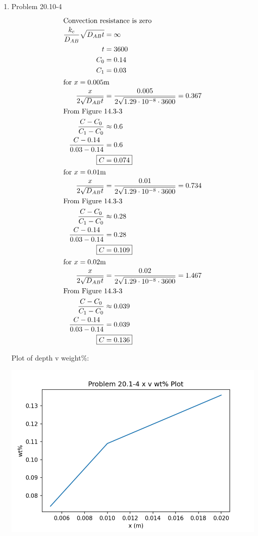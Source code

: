 \documentclass[12pt]{article}
\begin{document}
\begin{enumerate}
\newpage
    \item Problem 20.10-4
    \begin{align*}
        \intertext{Convection resistance is zero}
        \frac{k_c}{D_{AB}} \sqrt{D_{AB} t} &= \infty \\
        t &= 3600 \\
        C_0 &= 0.14 \\
        C_1 &= 0.03 \\
        \intertext{for $x=0.005$m}
        \frac{x}{2\sqrt{D_{AB} t}} &= \frac{0.005}{2\sqrt{1.29 \cdot 10^{-8} \cdot 3600}} = 0.367 \\
        \intertext{From Figure 14.3-3}
        \frac{C - C_0}{C_1 - C_0} &\approx 0.6 \\
        \frac{C - 0.14}{0.03 - 0.14} &= 0.6 \\
        \Aboxed{C &= 0.074} \\
        \intertext{for $x=0.01$m}
        \frac{x}{2\sqrt{D_{AB} t}} &= \frac{0.01}{2\sqrt{1.29 \cdot 10^{-8} \cdot 3600}} = 0.734 \\
        \intertext{From Figure 14.3-3}
        \frac{C - C_0}{C_1 - C_0} &\approx 0.28 \\
        \frac{C - 0.14}{0.03 - 0.14} &= 0.28 \\
        \Aboxed{C &= 0.109} \\
        \intertext{for $x=0.02$m}
        \frac{x}{2\sqrt{D_{AB} t}} &= \frac{0.02}{2\sqrt{1.29 \cdot 10^{-8} \cdot 3600}} = 1.467 \\
        \intertext{From Figure 14.3-3}
        \frac{C - C_0}{C_1 - C_0} &\approx 0.039 \\
        \frac{C - 0.14}{0.03 - 0.14} &= 0.039 \\
        \Aboxed{C &= 0.136} \\
    \end{align*}

    Plot of depth v weight\%:
    
    \includegraphics[]{Problem 20.1-4 fig.png}
\end{enumerate}
\end{document}

